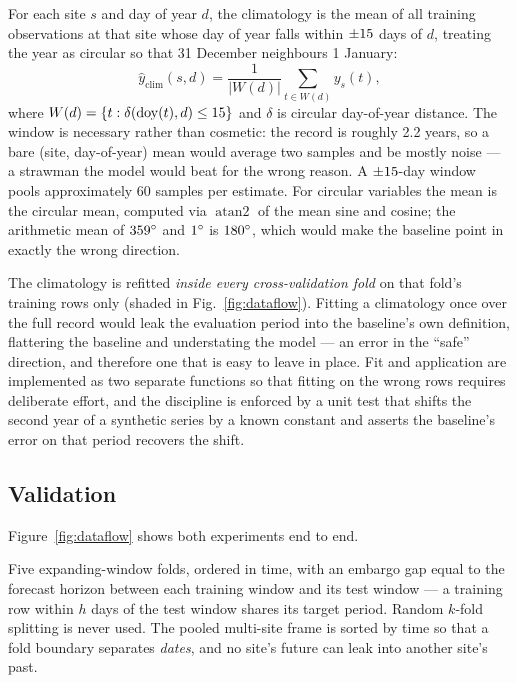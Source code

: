 For each site $s$ and day of year $d$, the climatology is the mean of all
training observations at that site whose day of year falls within
$\pm15$ days of $d$, treating the year as circular so that 31
December neighbours 1 January:
%
\begin{equation}
\hat{y}_{\text{clim}}(s, d) = \frac{1}{|W(d)|}\sum_{t \in W(d)} y_s(t),
\end{equation}
%
where $W(d) = \{t : \delta(\mathrm{doy}(t), d) \leq 15\}$ and $\delta$
is circular day-of-year distance. The window is necessary
rather than cosmetic: the record is roughly 2.2 years, so a bare
(site, day-of-year) mean would average two samples and be mostly noise --- a
strawman the model would beat for the wrong reason. A $\pm15$-day
window pools approximately 60 samples per estimate. For circular variables the
mean is the circular mean, computed via $\operatorname{atan2}$ of the mean sine
and cosine; the arithmetic mean of $359^{\circ}$ and $1^{\circ}$ is $180^{\circ}$,
which would make the baseline point in exactly the wrong direction.

The climatology is refitted \emph{inside every cross-validation fold} on that
fold's training rows only (shaded in Fig.~\ref{fig:dataflow}). Fitting a
climatology once over the full record would leak the evaluation period into the
baseline's own definition, flattering the baseline and understating the model
--- an error in the ``safe'' direction, and therefore one that is easy to leave
in place. Fit and application are implemented as two separate functions so that
fitting on the wrong rows requires deliberate effort, and the discipline is
enforced by a unit test that shifts the second year of a synthetic series by a
known constant and asserts the baseline's error on that period recovers the
shift.

\subsection{Validation}

Figure~\ref{fig:dataflow} shows both experiments end to end.

Five expanding-window folds, ordered in time, with an embargo gap equal to the
forecast horizon between each training window and its test window --- a
training row within $h$ days of the test window shares its target period.
Random $k$-fold splitting is never used. The pooled multi-site frame is sorted
by time so that a fold boundary separates \emph{dates}, and no site's future
can leak into another site's past.

